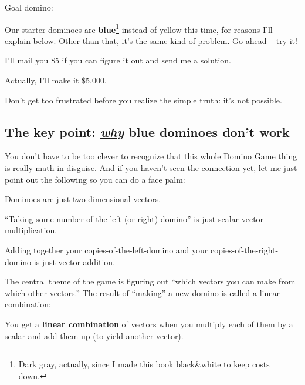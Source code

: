 Goal domino:
\hspace{1.3in}

Our starter dominoes are \textbf{blue}\footnote{Dark gray, actually, since I
made this book black\&white to keep costs down.} instead of yellow this time,
for reasons I'll explain below. Other than that, it's the same kind of problem.
Go ahead -- try it!

I'll mail you \$5 if you can figure it out and send me a solution.

Actually, I'll make it \$5,000.

Don't get too frustrated before you realize the simple truth: it's not
possible.

\subsection{The key point: \underline{\textit{why}} blue dominoes don't work}

You don't have to be too clever to recognize that this whole Domino Game thing
is really math in disguise. And if you haven't seen the connection yet, let me
just point out the following so you can do a face palm:

\begin{compactitem}
\item Dominoes are just two-dimensional vectors.
\item ``Taking some number of the left (or right) domino'' is just
scalar-vector multiplication.
\item Adding together your copies-of-the-left-domino and your
copies-of-the-right-domino is just vector addition.
\end{compactitem}

The central theme of the game is figuring out ``which vectors you can make from
which other vectors.'' The result of ``making'' a new domino is called a linear
combination:

\begin{center}
You get a \textbf{linear combination} of vectors when you multiply each of them
by a scalar and add them up (to yield another vector).
\end{center}

